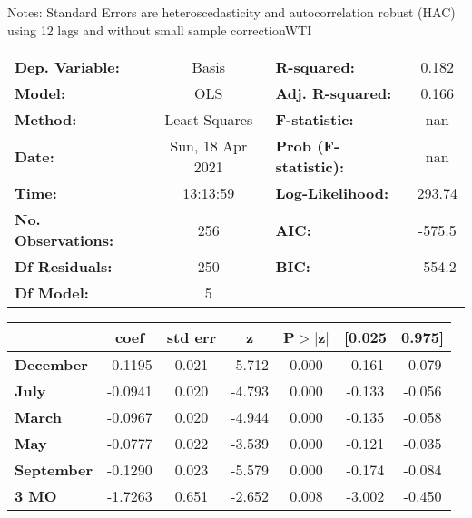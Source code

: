 Notes: \newline
 [1] Standard Errors are heteroscedasticity and autocorrelation robust (HAC) using 12 lags and without small sample correctionWTI\begin{center}
\begin{tabular}{lclc}
\toprule
\textbf{Dep. Variable:}    &      Basis       & \textbf{  R-squared:         } &     0.182   \\
\textbf{Model:}            &       OLS        & \textbf{  Adj. R-squared:    } &     0.166   \\
\textbf{Method:}           &  Least Squares   & \textbf{  F-statistic:       } &       nan   \\
\textbf{Date:}             & Sun, 18 Apr 2021 & \textbf{  Prob (F-statistic):} &      nan    \\
\textbf{Time:}             &     13:13:59     & \textbf{  Log-Likelihood:    } &    293.74   \\
\textbf{No. Observations:} &         256      & \textbf{  AIC:               } &    -575.5   \\
\textbf{Df Residuals:}     &         250      & \textbf{  BIC:               } &    -554.2   \\
\textbf{Df Model:}         &           5      & \textbf{                     } &             \\
\bottomrule
\end{tabular}
\begin{tabular}{lcccccc}
                   & \textbf{coef} & \textbf{std err} & \textbf{z} & \textbf{P$> |$z$|$} & \textbf{[0.025} & \textbf{0.975]}  \\
\midrule
\textbf{December}  &      -0.1195  &        0.021     &    -5.712  &         0.000        &       -0.161    &       -0.079     \\
\textbf{July}      &      -0.0941  &        0.020     &    -4.793  &         0.000        &       -0.133    &       -0.056     \\
\textbf{March}     &      -0.0967  &        0.020     &    -4.944  &         0.000        &       -0.135    &       -0.058     \\
\textbf{May}       &      -0.0777  &        0.022     &    -3.539  &         0.000        &       -0.121    &       -0.035     \\
\textbf{September} &      -0.1290  &        0.023     &    -5.579  &         0.000        &       -0.174    &       -0.084     \\
\textbf{3 MO}      &      -1.7263  &        0.651     &    -2.652  &         0.008        &       -3.002    &       -0.450     \\

\end{tabular}
\end{center}
